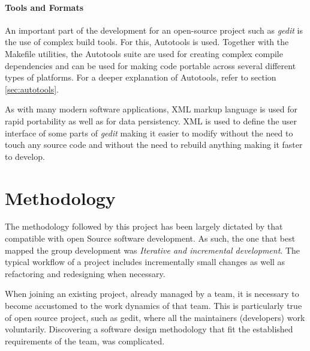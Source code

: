 \paragraph{Tools and Formats}


An important part of the development for an open-source project such as \emph{gedit} is 
the use of complex build tools.   For this, Autotools is used. 
Together with the Makefile utilities, the Autotools suite are used for creating complex
compile dependencies and can be used for making code portable across several different 
types of platforms. For a deeper explanation of Autotools, refer to section \ref{sec:autotools}.

As with many modern software applications, XML markup language is used for 
rapid portability as well as for data persistency. XML is used to 
define the user interface of some parts of \emph{gedit} making it easier to
modify without the need to touch any source code and without the need to 
rebuild anything making it faster to develop.


\section{Methodology}\label{sec:Methodology}

The methodology followed by this project has been largely dictated by that compatible 
with open Source software development.    As such, the one that best mapped the group 
development was  \emph{Iterative and incremental development}.
The typical workflow of a  \GNOME project includes incrementally small changes 
as well as refactoring and redesigning when necessary.

When joining an existing project, already managed by a team, it is necessary to 
become accustomed to the work dynamics of that team. This is particularly true of 
open source project, such as gedit, where all the maintainers (developers) work 
voluntarily.  Discovering a software design methodology that fit the established 
requirements of the team, was complicated.



